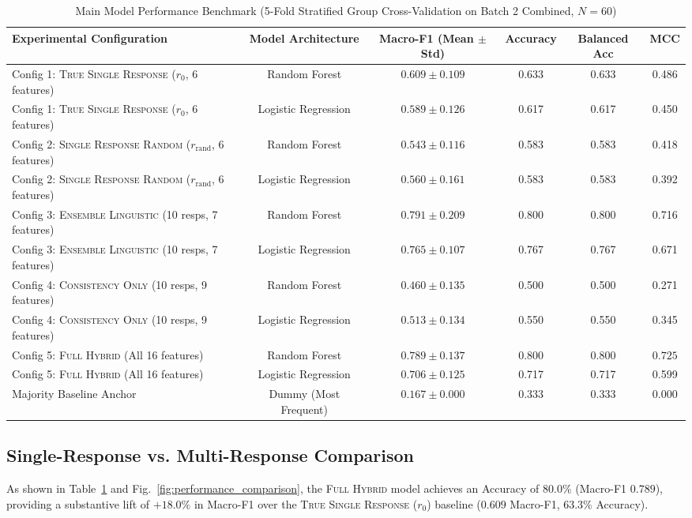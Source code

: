 \documentclass[conference]{IEEEtran}
\begin{document}
\begin{table}[t]
\caption{Main Model Performance Benchmark (5-Fold Stratified Group Cross-Validation on Batch 2 Combined, $N=60$)}
\label{tab:main_results}
\centering
\begin{tabularx}{\textwidth}{lccccc}
\toprule
\textbf{Experimental Configuration} & \textbf{Model Architecture} & \textbf{Macro-F1 (Mean $\pm$ Std)} & \textbf{Accuracy} & \textbf{Balanced Acc} & \textbf{MCC} \\
\midrule
Config 1: \textsc{True Single Response} ($r_0$, 6 features) & Random Forest & $0.609 \pm 0.109$ & 0.633 & 0.633 & 0.486 \\
Config 1: \textsc{True Single Response} ($r_0$, 6 features) & Logistic Regression & $0.589 \pm 0.126$ & 0.617 & 0.617 & 0.450 \\
Config 2: \textsc{Single Response Random} ($r_{\text{rand}}$, 6 features) & Random Forest & $0.543 \pm 0.116$ & 0.583 & 0.583 & 0.418 \\
Config 2: \textsc{Single Response Random} ($r_{\text{rand}}$, 6 features) & Logistic Regression & $0.560 \pm 0.161$ & 0.583 & 0.583 & 0.392 \\
Config 3: \textsc{Ensemble Linguistic} (10 resps, 7 features) & Random Forest & $\mathbf{0.791 \pm 0.209}$ & $\mathbf{0.800}$ & $\mathbf{0.800}$ & 0.716 \\
Config 3: \textsc{Ensemble Linguistic} (10 resps, 7 features) & Logistic Regression & $0.765 \pm 0.107$ & 0.767 & 0.767 & 0.671 \\
Config 4: \textsc{Consistency Only} (10 resps, 9 features) & Random Forest & $0.460 \pm 0.135$ & 0.500 & 0.500 & 0.271 \\
Config 4: \textsc{Consistency Only} (10 resps, 9 features) & Logistic Regression & $0.513 \pm 0.134$ & 0.550 & 0.550 & 0.345 \\
Config 5: \textsc{Full Hybrid} (All 16 features) & Random Forest & $\mathbf{0.789 \pm 0.137}$ & $\mathbf{0.800}$ & $\mathbf{0.800}$ & $\mathbf{0.725}$ \\
Config 5: \textsc{Full Hybrid} (All 16 features) & Logistic Regression & $0.706 \pm 0.125$ & 0.717 & 0.717 & 0.599 \\
Majority Baseline Anchor & Dummy (Most Frequent) & $0.167 \pm 0.000$ & 0.333 & 0.333 & 0.000 \\
\bottomrule
\end{tabularx}
\end{table}

\subsection{Single-Response vs. Multi-Response Comparison}
As shown in Table~\ref{tab:main_results} and Fig.~\ref{fig:performance_comparison}, the \textsc{Full Hybrid} model achieves an Accuracy of $80.0\%$ (Macro-F1 $0.789$), providing a substantive lift of $+18.0\%$ in Macro-F1 over the \textsc{True Single Response} ($r_0$) baseline ($0.609$ Macro-F1, $63.3\%$ Accuracy). 
\end{document}

